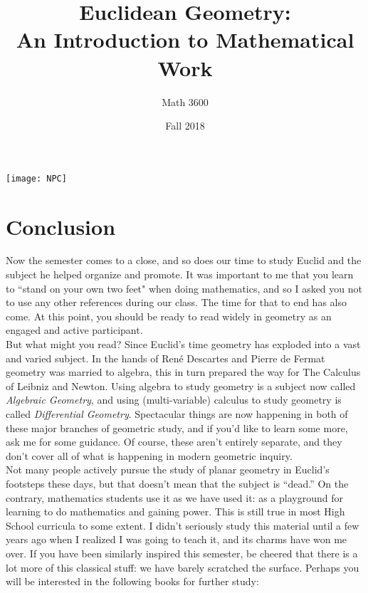 \documentclass{tufte-handout}
\title{Euclidean Geometry:\\An Introduction to Mathematical Work}
\author[Math 3600]{Math 3600}
\date{Fall 2018}
\theoremstyle{definition}
\begin{document}
\maketitle

\begin{marginfigure}
    \texttt{[image: NPC]}
\end{marginfigure}

\section*{Conclusion}


Now the semester comes to a close, and so does our time to study Euclid and the subject he helped organize and promote. It was important to me that you learn to ``stand on your own two feet" when doing mathematics, and so I asked you not to use any other references during our class. The time for that to end has also come. At this point, you should be ready to read widely in geometry as an engaged and active participant.\\

But what might you read? Since Euclid's time geometry has exploded into a vast and varied subject. 
In the hands of Ren\'{e} Descartes and Pierre de Fermat geometry was married to algebra, this in turn prepared the way for The Calculus of Leibniz and Newton. 
Using algebra to study geometry is a subject now called \emph{Algebraic Geometry}, and using (multi-variable) calculus to study geometry is called \emph{Differential Geometry}.  Spectacular things are now happening in both of these major branches of geometric study, and if you'd like to learn some more, ask me for some guidance. 
Of course, these aren't entirely separate, and they don't cover all of what is happening in modern geometric inquiry.\\

Not many people actively pursue the study of planar geometry in Euclid's footsteps these days, but that doesn't mean that the subject is ``dead.'' On the contrary, mathematics students use it as we have used it: as a playground for learning to do mathematics and gaining power. This is still true in most High School curricula to some extent. I didn't seriously study this material until a few years ago when I realized I was going to teach it, and its charms have won me over. If you have been similarly inspired this semester, be cheered that there is a lot more of this classical stuff: we have barely scratched the surface. Perhaps you will be interested in the following books for further study:
\end{document}
